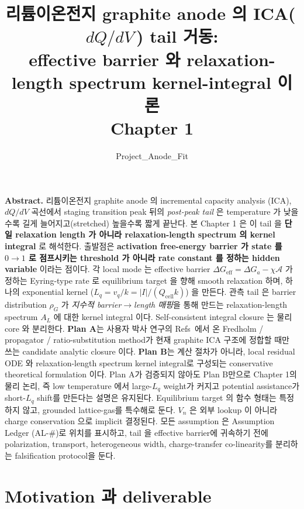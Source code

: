 \documentclass[11pt,a4paper]{article}
\title{\textbf{리튬이온전지 graphite anode 의 ICA(\,$dQ/dV$\,) tail 거동:\\
effective barrier 와 relaxation-length spectrum kernel-integral 이론}\\[0.4em]
\large Chapter 1}
\author{Project\_Anode\_Fit}
\date{}
\newcommand{\eff}{\mathrm{eff}}
\newcommand{\cell}{\mathrm{cell}}
\begin{document}
\maketitle

\begin{center}\begin{minipage}{0.93\textwidth}
\small \textbf{Abstract.} 리튬이온전지 graphite anode 의 incremental capacity analysis
(ICA), $dQ/dV$ 곡선에서 staging transition peak 뒤의 \emph{post-peak tail} 은 temperature
가 낮을수록 길게 늘어지고(stretched) 높을수록 짧게 끝난다. 본 Chapter 1 은 이 tail 을
\textbf{단일 relaxation length 가 아니라 relaxation-length spectrum 의 kernel integral}
로 해석한다. 출발점은 \textbf{activation free-energy barrier 가 state 를 $0\!\to\!1$ 로
점프시키는 threshold 가 아니라 rate constant 를 정하는 hidden variable} 이라는 점이다.
각 local mode 는 effective barrier $\Delta G_\eff = \Delta G_a-\chi\mathcal A$ 가 정하는
Eyring-type rate 로 equilibrium target 을 향해 smooth relaxation 하며, 하나의 exponential
kernel ($L_q=v_q/k=|I|/(Q_\cell k)$) 을 만든다. 관측 tail 은 barrier distribution $\rho_G$ 가 \emph{지수적
barrier$\to$length 매핑}을 통해 만드는 relaxation-length spectrum $A_L$ 에 대한 kernel
integral 이다. Self-consistent integral closure 는 물리 core 와 분리한다. \textbf{Plan A}는
사용자 박사 연구의 Refs~\cite{lee2011,son2013}에서 온 Fredholm / propagator / ratio-substitution
method가 현재 graphite ICA 구조에 정합할 때만 쓰는 candidate analytic closure 이다.
\textbf{Plan B}는 계산 절차가 아니라, local residual ODE 와 relaxation-length spectrum
kernel integral로 구성되는 conservative theoretical formulation 이다. Plan A가 검증되지 않아도
Plan B만으로 Chapter 1의 물리 논리, 즉 low temperature 에서 large-$L_q$ weight가 커지고
potential assistance가 short-$L_q$ shift를 만든다는 설명은 유지된다. Equilibrium target 의 함수
형태는 특정하지 않고, grounded lattice-gas를 특수해로 둔다. $V_n$ 은 외부 lookup 이 아니라
charge conservation 으로 implicit 결정된다. 모든 assumption 은 Assumption Ledger (AL-\#)로
위치를 표시하고, tail 을 effective barrier에 귀속하기 전에 polarization, transport,
heterogeneous width, charge-transfer co-linearity를 분리하는 falsification protocol을 둔다.
\end{minipage}\end{center}

\tableofcontents
\newpage

\section{Motivation 과 deliverable}\label{sec:intro}
\end{document}
